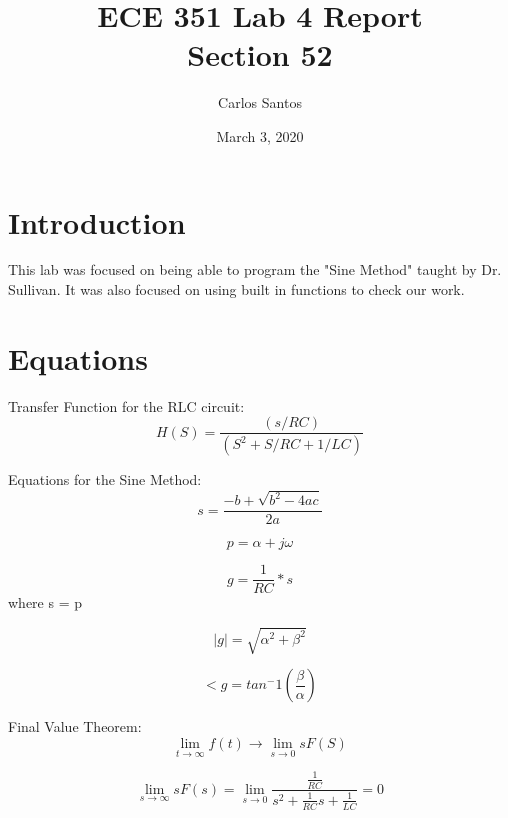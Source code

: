 \documentclass[12pt]{article}
\title{ECE 351 Lab 4 Report \\ Section 52}
\date{March 3, 2020}
\author{Carlos Santos}
\begin{document}
\vspace{\fill}
\maketitle
\vspace{\fill}
\clearpage

\section*{Introduction}

This lab was focused on being able to program the "Sine Method" taught by Dr. Sullivan.
It was also focused on using built in functions to check our work.

\section*{Equations}

Transfer Function for the RLC circuit:
\begin{equation}
    H(S) = \frac{(s/RC)}{(S^2 + S/RC + 1/LC)}
\end{equation}

Equations for the  Sine  Method:
\begin{equation}
    s = \frac{-b+\sqrt{b^2 - 4ac}}{2a}
\end{equation}

\begin{equation}
    p = \alpha + j\omega
\end{equation}

\begin{equation}
    g = \frac{1}{RC} * s 
\end{equation}
where s = p

\begin{equation}
    |g| = \sqrt{\alpha ^ 2 + \beta ^ 2}
\end{equation}

\begin{equation}
    <g = tan^-1 (\frac{\beta}{\alpha})
\end{equation}

Final Value Theorem:
\begin{equation}
    \lim_{t\to\infty} f(t) \xrightarrow{} \lim_{s\to 0}sF(S)
\end{equation}

\begin{equation}
    \lim_{s\to\infty} sF(s) = \lim_{s\to 0} \frac{\frac{1}{RC}}{s^2 + \frac{1}{RC}s + \frac{1}{LC}} = 0
\end{equation}
\end{document}
